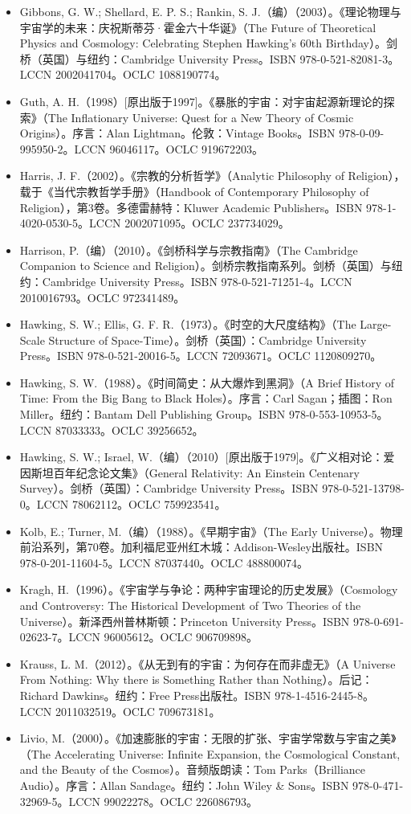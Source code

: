 \begin{itemize}
\item Gibbons, G. W.; Shellard, E. P. S.; Rankin, S. J.（编）（2003）。《理论物理与宇宙学的未来：庆祝斯蒂芬·霍金六十华诞》（The Future of Theoretical Physics and Cosmology: Celebrating Stephen Hawking's 60th Birthday）。剑桥（英国）与纽约：Cambridge University Press。ISBN 978-0-521-82081-3。LCCN 2002041704。OCLC 1088190774。  
\item Guth, A. H.（1998）[原出版于1997]。《暴胀的宇宙：对宇宙起源新理论的探索》（The Inflationary Universe: Quest for a New Theory of Cosmic Origins）。序言：Alan Lightman。伦敦：Vintage Books。ISBN 978-0-09-995950-2。LCCN 96046117。OCLC 919672203。  
\item Harris, J. F.（2002）。《宗教的分析哲学》（Analytic Philosophy of Religion），载于《当代宗教哲学手册》（Handbook of Contemporary Philosophy of Religion），第3卷。多德雷赫特：Kluwer Academic Publishers。ISBN 978-1-4020-0530-5。LCCN 2002071095。OCLC 237734029。  
\item Harrison, P.（编）（2010）。《剑桥科学与宗教指南》（The Cambridge Companion to Science and Religion）。剑桥宗教指南系列。剑桥（英国）与纽约：Cambridge University Press。ISBN 978-0-521-71251-4。LCCN 2010016793。OCLC 972341489。  
\item Hawking, S. W.; Ellis, G. F. R.（1973）。《时空的大尺度结构》（The Large-Scale Structure of Space-Time）。剑桥（英国）：Cambridge University Press。ISBN 978-0-521-20016-5。LCCN 72093671。OCLC 1120809270。  
\item Hawking, S. W.（1988）。《时间简史：从大爆炸到黑洞》（A Brief History of Time: From the Big Bang to Black Holes）。序言：Carl Sagan；插图：Ron Miller。纽约：Bantam Dell Publishing Group。ISBN 978-0-553-10953-5。LCCN 87033333。OCLC 39256652。  
\item Hawking, S. W.; Israel, W.（编）（2010）[原出版于1979]。《广义相对论：爱因斯坦百年纪念论文集》（General Relativity: An Einstein Centenary Survey）。剑桥（英国）：Cambridge University Press。ISBN 978-0-521-13798-0。LCCN 78062112。OCLC 759923541。  
\item Kolb, E.; Turner, M.（编）（1988）。《早期宇宙》（The Early Universe）。物理前沿系列，第70卷。加利福尼亚州红木城：Addison-Wesley出版社。ISBN 978-0-201-11604-5。LCCN 87037440。OCLC 488800074。  
\item Kragh, H.（1996）。《宇宙学与争论：两种宇宙理论的历史发展》（Cosmology and Controversy: The Historical Development of Two Theories of the Universe）。新泽西州普林斯顿：Princeton University Press。ISBN 978-0-691-02623-7。LCCN 96005612。OCLC 906709898。  
\item Krauss, L. M.（2012）。《从无到有的宇宙：为何存在而非虚无》（A Universe From Nothing: Why there is Something Rather than Nothing）。后记：Richard Dawkins。纽约：Free Press出版社。ISBN 978-1-4516-2445-8。LCCN 2011032519。OCLC 709673181。  
\item Livio, M.（2000）。《加速膨胀的宇宙：无限的扩张、宇宙学常数与宇宙之美》（The Accelerating Universe: Infinite Expansion, the Cosmological Constant, and the Beauty of the Cosmos）。音频版朗读：Tom Parks（Brilliance Audio）。序言：Allan Sandage。纽约：John Wiley & Sons。ISBN 978-0-471-32969-5。LCCN 99022278。OCLC 226086793。  
\end{itemize}







